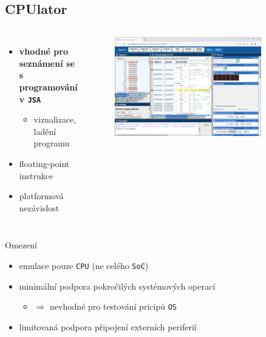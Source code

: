 \documentclass[compress]{beamer}
\begin{document}
\subsection{CPUlator}

\begin{frame}
	\vspace{-0.4cm}
	\begin{columns}
		\begin{itemize}
			\item \textbf{vhodné pro seznámení se s programování v \texttt{JSA}}
			\begin{itemize}
				\item vizualizace, ladění programu
			\end{itemize}
			\item floating-point instrukce
			\item platformová nezávislost
		\end{itemize}
		\begin{figure}
			\centering
			\includegraphics[width=0.85\textwidth]{img/cpulator.png}
			\caption{\href{https://cpulator.01xz.net}{}}
			\label{CPUlator}
		\end{figure}
	\end{columns}
	\noindent\makebox[\linewidth]{\rule{\textwidth}{0.4pt}}
	\begin{block}{Omezení}
		\begin{itemize}
			\item emulace pouze \texttt{CPU} (ne celého \texttt{SoC})
			\item minimální podpora pokročilých systémových operací
			\begin{itemize}
				\item $\Rightarrow$ nevhodné pro testování pricipů \texttt{OS}
			\end{itemize}
			\item limitovaná podpora připojení externích periferií
		\end{itemize}
	\end{block}
\end{frame}
\end{document}
